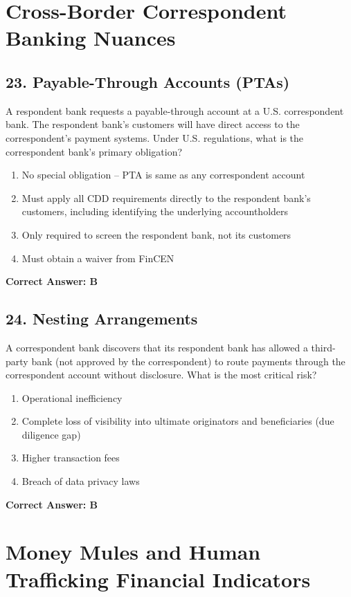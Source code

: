 \documentclass[11pt,a4paper]{article}
\begin{document}
	\section{Cross-Border Correspondent Banking Nuances}
	
	\subsection{23. Payable-Through Accounts (PTAs)}
	A respondent bank requests a payable-through account at a U.S. correspondent bank. The respondent bank’s customers will have direct access to the correspondent’s payment systems. Under U.S. regulations, what is the correspondent bank’s primary obligation?
	\begin{enumerate}[label=\Alph*.]
		\item No special obligation – PTA is same as any correspondent account
		\item Must apply all CDD requirements directly to the respondent bank’s customers, including identifying the underlying accountholders
		\item Only required to screen the respondent bank, not its customers
		\item Must obtain a waiver from FinCEN
	\end{enumerate}
	\textbf{Correct Answer: B}
	
	\subsection{24. Nesting Arrangements}
	A correspondent bank discovers that its respondent bank has allowed a third-party bank (not approved by the correspondent) to route payments through the correspondent account without disclosure. What is the most critical risk?
	\begin{enumerate}[label=\Alph*.]
		\item Operational inefficiency
		\item Complete loss of visibility into ultimate originators and beneficiaries (due diligence gap)
		\item Higher transaction fees
		\item Breach of data privacy laws
	\end{enumerate}
	\textbf{Correct Answer: B}
	
	\section{Money Mules and Human Trafficking Financial Indicators}
	
\end{document}

